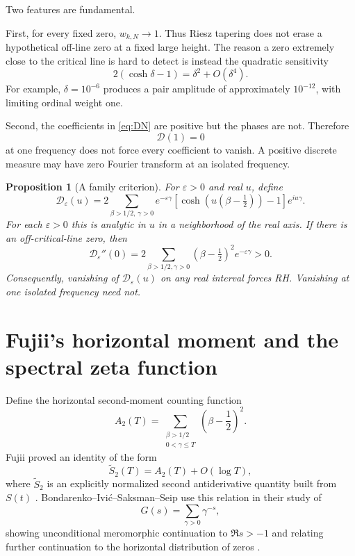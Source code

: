 \documentclass[11pt]{article}
\newtheorem{proposition}[theorem]{Proposition}
\theoremstyle{definition}
\theoremstyle{remark}
\newcommand{\cD}{\mathcal D}
\begin{document}
Two features are fundamental.

First, for every fixed zero, $w_{k,N}\to1$.  Thus Riesz tapering does not erase a hypothetical off-line zero at a fixed large height.  The reason a zero extremely close to the critical line is hard to detect is instead the quadratic sensitivity
\begin{equation}\label{eq:quadraticdefect}
2(\cosh\delta-1)=\delta^2+O(\delta^4).
\end{equation}
For example, $\delta=10^{-6}$ produces a pair amplitude of approximately $10^{-12}$, with limiting ordinal weight one.

Second, the coefficients in \eqref{eq:DN} are positive but the phases are not.  Therefore
\[
\cD(1)=0
\]
at one frequency does not force every coefficient to vanish.  A positive discrete measure may have zero Fourier transform at an isolated frequency.

\begin{proposition}[A family criterion]\label{prop:familycriterion}
For $\varepsilon>0$ and real $u$, define
\[
\cD_\varepsilon(u)
=2\sum_{\beta>1/2,\,\gamma>0}
 e^{-\varepsilon\gamma}
\left[\cosh\!\left(u(\beta-\tfrac12)\right)-1\right]e^{iu\gamma}.
\]
For each $\varepsilon>0$ this is analytic in $u$ in a neighborhood of the real axis.  If there is an off-critical-line zero, then
\[
\cD_\varepsilon''(0)
=2\sum_{\beta>1/2,\gamma>0}
(\beta-\tfrac12)^2e^{-\varepsilon\gamma}>0.
\]
Consequently, vanishing of $\cD_\varepsilon(u)$ on any real interval forces RH.  Vanishing at one isolated frequency need not.
\end{proposition}

\section{Fujii's horizontal moment and the spectral zeta function}\label{sec:fujii}

Define the horizontal second-moment counting function
\begin{equation}\label{eq:A2}
A_2(T)=
\sum_{\substack{\beta>1/2\\0<\gamma\le T}}
\left(\beta-\frac12\right)^2.
\end{equation}
Fujii proved an identity of the form
\begin{equation}\label{eq:Fujii}
\widetilde S_2(T)=A_2(T)+O(\log T),
\end{equation}
where $\widetilde S_2$ is an explicitly normalized second antiderivative quantity built from $S(t)$ \cite{Fujii2002}.  Bondarenko--Ivić--Saksman--Seip use this relation in their study of
\[
G(s)=\sum_{\gamma>0}\gamma^{-s},
\]
showing unconditional meromorphic continuation to $\Re s>-1$ and relating further continuation to the horizontal distribution of zeros \cite{BondarenkoIvicSaksmanSeip2019}.
\end{document}
